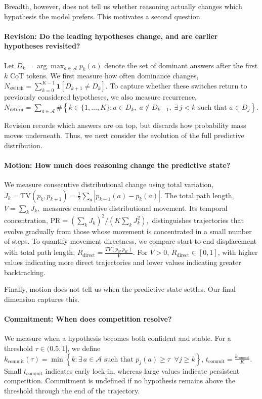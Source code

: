 \documentclass{article}
\begin{document}
Breadth, however, does not tell us whether reasoning actually changes which hypothesis the model prefers. This motivates a second question.

\paragraph{Revision: Do the leading hypotheses change, and are earlier hypotheses revisited?} 
Let \(D_k=\arg\max_{a\in\mathcal A}p_k(a)\) denote the set of dominant answers after the first \(k\) CoT tokens. We first measure how often dominance changes,
\(
N_{\mathrm{switch}}
=
\sum_{k=0}^{K-1}
\mathbf{1}[D_{k+1} \neq D_k].
\)
To capture whether these switches return to previously considered hypotheses, we also measure recurrence,
\(
N_{\mathrm{return}}
=
\sum_{a\in\mathcal{A}}
\#\left\{
k \in \{1,\ldots,K\} :
a\in D_k,\;
a\notin D_{k-1},\;
\exists\, j<k \text{ such that } a\in D_j
\right\}.
\)

Revision records which answers are on top, but discards how probability mass moves underneath. Thus, we next consider the evolution of the full predictive distribution.

\paragraph{Motion: How much does reasoning change the predictive state?}
We measure consecutive distributional change using total variation, 
$
J_k = \mathrm{TV}(p_k,p_{k+1}) = \frac{1}{2} \sum_a \left| p_{k+1}(a)-p_k(a) \right|.
$
The total path length,
$
V = \sum_k J_k,
$
measures cumulative distributional movement. Its temporal concentration,
$
\mathrm{PR} = { \left(\sum_k J_k\right)^2 }/{ (K\sum_k J_k^2)},
$
distinguishes trajectories that evolve gradually from those whose movement is concentrated in a small number of steps.  To quantify movement directness, we compare start-to-end displacement with total path length, \(R_{\mathrm{direct}} = \frac{TV(p_0, p_K)}{V}.\) For \(V>0\), \(R_{\mathrm{direct}}\in[0,1]\), with higher values indicating more direct trajectories and lower values indicating greater backtracking.

Finally, motion does not tell us when the predictive state settles. Our final dimension captures this.

\paragraph{Commitment: When does competition resolve?} We measure when a hypothesis becomes both confident and stable. For a threshold $\tau \in (0.5,1]$, we define
\(
k_{\mathrm{commit}}(\tau)
=
\min\left\{
k :
\exists\, a\in\mathcal{A}
\text{ such that }
p_j(a)\geq\tau
\;\; \forall j\geq k
\right\}\), $t_{\mathrm{commit}} = \frac{k_{\mathrm{commit}}}{K}.
$
Small $t_{\mathrm{commit}}$ indicates early lock-in, whereas large values indicate persistent competition. Commitment is undefined if no hypothesis remains above the threshold through the end of the trajectory. 
\end{document}
